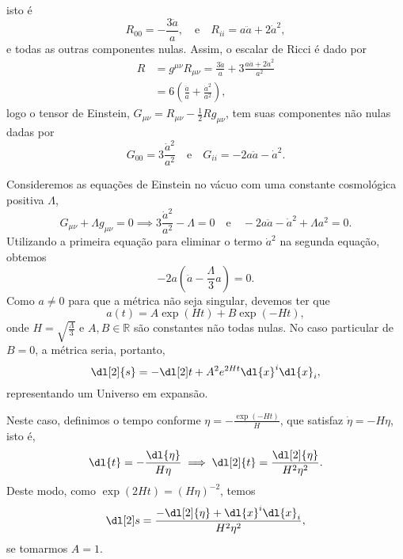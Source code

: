isto é
\begin{equation*}
    R_{00} = - \frac{3\ddot{a}}{a},\quad\text{e}\quad R_{ii} = a\ddot{a} + 2\dot{a}^2,
\end{equation*}
e todas as outras componentes nulas. Assim, o escalar de Ricci é dado por
\begin{align*}
    R &= g^{\mu\nu}R_{\mu\nu} = \frac{3\ddot{a}}{a} + 3 \frac{a\ddot{a} + 2 \dot{a}^2}{a^2}\\
      &= 6 \left(\frac{\ddot{a}}{a} + \frac{\dot{a}^2}{a^2}\right),
\end{align*}
logo o tensor de Einstein, \(G_{\mu\nu} = R_{\mu\nu} - \frac12 Rg_{\mu\nu}\), tem suas componentes não nulas dadas por
\begin{equation*}
    G_{00} = 3\frac{\dot{a}^2}{a^2}\quad\text{e}\quad G_{ii} = -2a \ddot{a} - \dot{a}^2.
\end{equation*}

Consideremos as equações de Einstein no vácuo com uma constante cosmológica positiva \(\Lambda\),
\begin{equation*}
    G_{\mu\nu} + \Lambda g_{\mu\nu} = 0 \implies 3\frac{\dot{a}^2}{a^2} - \Lambda = 0\quad\text{e}\quad -2a\ddot{a} - \dot{a}^2 + \Lambda a^2 = 0.
\end{equation*}
Utilizando a primeira equação para eliminar o termo \(\dot{a}^2\) na segunda equação, obtemos
\begin{equation*}
    -2a\left(\ddot{a} - \frac\Lambda3a\right) = 0.
\end{equation*}
Como \(a \neq 0\) para que a métrica não seja singular, devemos ter que
\begin{equation*}
    a(t) = A \exp{\left(H t\right)} + B \exp{\left(-H t\right)},
\end{equation*}
onde \(H = \sqrt{\frac\Lambda3}\) e \(A,B \in \mathbb{R}\) são constantes não todas nulas. No caso particular de \(B = 0\), a métrica seria, portanto,
\begin{equation*}
    \dl[2]{s} = -\dl[2]t + A^2e^{2H t} \dl{x}^i\dl{x}_i,
\end{equation*}
representando um Universo em expansão.

Neste caso, definimos o tempo conforme \(\eta = - \frac{\exp\left(-H t\right)}{H}\), que satisfaz \(\dot{\eta} = -H \eta\), isto é,
\begin{equation*}
    \dl{t} = -\frac{\dl{\eta}}{H \eta} \implies \dl[2]{t} = \frac{\dl[2]{\eta}}{H^2 \eta^2}.
\end{equation*}
Deste modo, como \(\exp{\left(2 H t\right)} = \left(H \eta\right)^{-2}\), temos
\begin{equation*}
    \dl[2]s = \frac{-\dl[2]{\eta} + \dl{x}^i\dl{x}_i}{H^2 \eta^2},
\end{equation*}
se tomarmos \(A = 1\).

